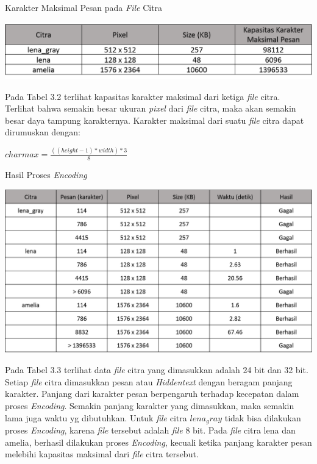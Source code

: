 	\begin{table}[H]
		\centering
		\caption{Karakter Maksimal Pesan pada \emph{File} Citra}
		\includegraphics[width=1.0\textwidth]{gambar/table_karaktermax3}
		\label{tabel_karaktermax2}
	\end{table}
	
	Pada Tabel 3.2 terlihat kapasitas karakter maksimal dari ketiga \emph{file} citra. Terlihat bahwa semakin besar ukuran \emph{pixel} dari \emph{file} citra, maka akan semakin besar daya tampung karakternya. Karakter maksimal dari suatu \emph{file} citra dapat dirumuskan dengan:
	
	\begin{center}
	$ charmax = \frac{((height - 1) * width ) * 3}{8}$
	\end{center}

	\begin{table}[H]
		\centering
		\caption{Hasil Proses \emph{Encoding}}
		\includegraphics[width=1.0\textwidth]{gambar/table_hasilencode3}
		\label{tabel_hasilencode3}
	\end{table}

	Pada Tabel 3.3 terlihat data \emph{file} citra yang dimasukkan adalah 24 bit dan 32 bit. Setiap  \emph{file} citra dimasukkan pesan atau \emph{Hiddentext} dengan beragam panjang karakter. Panjang dari karakter pesan berpengaruh terhadap kecepatan dalam proses \emph{Encoding}. Semakin panjang karakter yang dimasukkan, maka semakin lama juga waktu yg dibutuhkan. Untuk \emph{file} citra $lena_ gray$ tidak bisa dilakukan proses \emph{Encoding}, karena \emph{file} tersebut adalah \emph{file} 8 bit. Pada \emph{file} citra lena dan amelia, berhasil dilakukan proses \emph{Encoding}, kecuali ketika panjang karakter pesan melebihi kapasitas maksimal dari \emph{file} citra tersebut.


